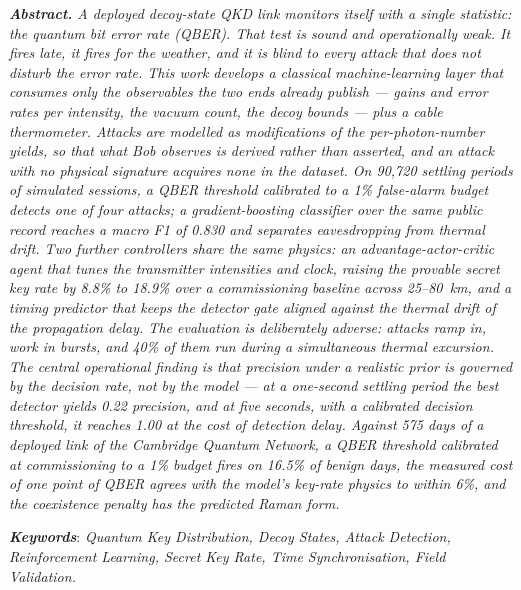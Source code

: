 \documentclass[12pt]{article}
\newenvironment{sbcabstract}[1]
  {\begin{list}{}{\setlength{\leftmargin}{1.2em}\setlength{\rightmargin}{1.2em}}%
   \item[]\itshape\textbf{\upshape\textit{#1}}\hspace{0.4em}}
  {\end{list}}
\begin{document}
\begin{sbcabstract}{Abstract.}
A deployed decoy-state QKD link monitors itself with a single statistic: the
quantum bit error rate (QBER). That test is sound and operationally weak. It
fires late, it fires for the weather, and it is blind to every attack that does
not disturb the error rate. This work develops a classical machine-learning
layer that consumes only the observables the two ends already publish --- gains
and error rates per intensity, the vacuum count, the decoy bounds --- plus a
cable thermometer. Attacks are modelled as modifications of the per-photon-number
yields, so that what Bob observes is derived rather than asserted, and an attack
with no physical signature acquires none in the dataset. On 90{,}720 settling
periods of simulated sessions, a QBER threshold calibrated to a 1\% false-alarm
budget detects one of four attacks; a gradient-boosting classifier over the same
public record reaches a macro F1 of 0.830 and separates eavesdropping from
thermal drift. Two further controllers share the same physics: an
advantage-actor-critic agent that tunes the transmitter intensities and clock,
raising the provable secret key rate by 8.8\% to 18.9\% over a commissioning
baseline across 25--80~km, and a timing predictor that keeps the detector gate
aligned against the thermal drift of the propagation delay. The evaluation is
deliberately adverse: attacks ramp in, work in bursts, and 40\% of them run
during a simultaneous thermal excursion. The central operational finding is that
precision under a realistic prior is governed by the decision rate, not by the
model --- at a one-second settling period the best detector yields 0.22
precision, and at five seconds, with a calibrated decision threshold, it reaches
1.00 at the cost of detection delay. Against 575 days of a deployed link of the
Cambridge Quantum Network, a QBER threshold calibrated at commissioning to a 1\%
budget fires on 16.5\% of benign days, the measured cost of one point of QBER
agrees with the model's key-rate physics to within 6\%, and the coexistence
penalty has the predicted Raman form.
\end{sbcabstract}

\vspace{0.4em}
\noindent\textbf{\textit{Keywords}}: \textit{Quantum Key Distribution, Decoy States,
Attack Detection, Reinforcement Learning, Secret Key Rate, Time Synchronisation,
Field Validation.}

\vspace{0.9em}
\end{document}
